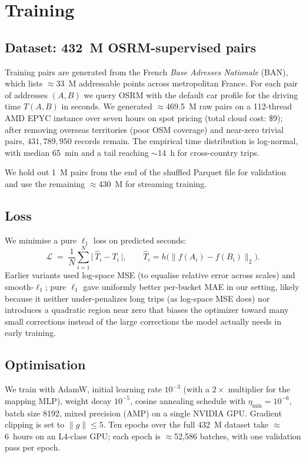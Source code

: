 \documentclass[11pt,a4paper]{article}
\begin{document}
\section{Training}
\label{sec:training}

\subsection{Dataset: 432~M OSRM-supervised pairs}
Training pairs are generated from the French \emph{Base Adresses
Nationale} (BAN), which lists $\approx$33~M addressable points across
metropolitan France. For each pair of addresses $(A, B)$ we query OSRM
with the default car profile for the driving time $T(A, B)$ in
seconds. We generated $\approx$469.5~M raw pairs on a 112-thread AMD
EPYC instance over seven hours on spot pricing (total cloud cost:
\$9); after removing overseas territories (poor OSM coverage) and
near-zero trivial pairs, $431{,}789{,}950$ records remain. The
empirical time distribution is log-normal, with median 65~min and a
tail reaching $\sim$14~h for cross-country trips.

We hold out 1~M pairs from the end of the shuffled Parquet file for
validation and use the remaining $\approx$430~M for streaming training.

\subsection{Loss}
We minimise a pure $\ell_{1}$ loss on predicted seconds:
\[
  \mathcal{L} \;=\; \frac{1}{N} \sum_{i=1}^{N}
  \bigl|\,\hat T_{i} - T_{i}\,\bigr|,
  \qquad
  \hat T_{i} = h\!\bigl(\|f(A_{i}) - f(B_{i})\|_{2}\bigr).
\]
Earlier variants used log-space MSE (to equalise relative error
across scales) and smooth-$\ell_{1}$; pure $\ell_{1}$ gave uniformly
better per-bucket MAE in our setting, likely because it neither
under-penalizes long trips (as log-space MSE does) nor introduces a
quadratic region near zero that biases the optimizer toward many
small corrections instead of the large corrections the model
actually needs in early training.

\subsection{Optimisation}
We train with AdamW, initial learning rate $10^{-3}$ (with a
$2\times$ multiplier for the mapping MLP), weight decay $10^{-5}$,
cosine annealing schedule with $\eta_{\min} = 10^{-6}$, batch size
8192, mixed precision (AMP) on a single NVIDIA GPU. Gradient clipping
is set to $\|g\|\leq 5$. Ten epochs over the full 432~M dataset take
$\approx$6~hours on an L4-class GPU; each epoch is
$\approx$52{,}586 batches, with one validation pass per epoch.
\end{document}

